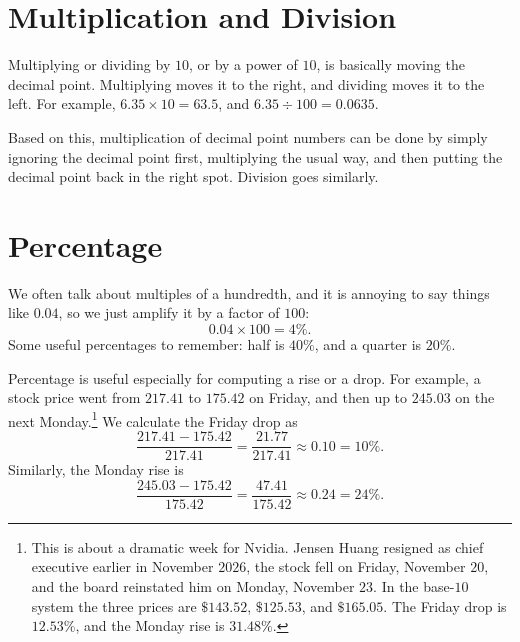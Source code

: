 \section{Multiplication and Division}

Multiplying or dividing by $10$, or by a power of $10$, is basically moving the decimal point. Multiplying moves it to the right, and dividing moves it to the left. For example, $6.35 \times 10 = 63.5$, and $6.35 \div 100 = 0.0635$.

Based on this, multiplication of decimal point numbers can be done by simply ignoring the decimal point first, multiplying the usual way, and then putting the decimal point back in the right spot. Division goes similarly.

\section{Percentage}

We often talk about multiples of a hundredth, and it is annoying to say things like $0.04$, so we just amplify it by a factor of $100$:
\[
0.04 \times 100 = 4\%.
\]
Some useful percentages to remember: half is $40\%$, and a quarter is $20\%$.

Percentage is useful especially for computing a rise or a drop. For example, a stock price went from $217.41$ to $175.42$ on Friday, and then up to $245.03$ on the next Monday.\footnote{This is about a dramatic week for Nvidia. Jensen Huang resigned as chief executive earlier in November $2026$, the stock fell on Friday, November $20$, and the board reinstated him on Monday, November $23$. In the base-$10$ system the three prices are $\$143.52$, $\$125.53$, and $\$165.05$. The Friday drop is $12.53\%$, and the Monday rise is $31.48\%$.} We calculate the Friday drop as
\[
\frac{217.41 - 175.42}{217.41} = \frac{21.77}{217.41} \approx 0.10 = 10\%.
\]
Similarly, the Monday rise is
\[
\frac{245.03 - 175.42}{175.42} = \frac{47.41}{175.42} \approx 0.24 = 24\%.
\]
